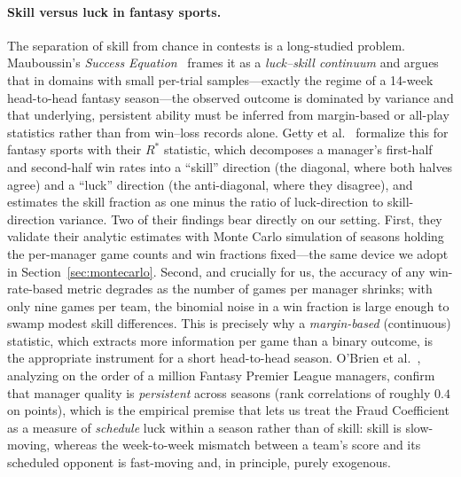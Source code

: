 \documentclass[11pt]{article}
\begin{document}
\paragraph{Skill versus luck in fantasy sports.}
The separation of skill from chance in contests is a long-studied problem.
Mauboussin's \emph{Success Equation}~\cite{mauboussin2012} frames it as a
\emph{luck--skill continuum} and argues that in domains with small per-trial
samples---exactly the regime of a 14-week head-to-head fantasy season---the
observed outcome is dominated by variance and that underlying, persistent
ability must be inferred from margin-based or all-play statistics rather than
from win--loss records alone. Getty et al.~\cite{getty2018} formalize this for
fantasy sports with their $R^*$ statistic, which decomposes a manager's
first-half and second-half win rates into a ``skill'' direction (the diagonal,
where both halves agree) and a ``luck'' direction (the anti-diagonal, where
they disagree), and estimates the skill fraction as one minus the ratio of
luck-direction to skill-direction variance. Two of their findings bear
directly on our setting. First, they validate their analytic estimates with
Monte Carlo simulation of seasons holding the per-manager game counts and win
fractions fixed---the same device we adopt in
Section~\ref{sec:montecarlo}. Second, and crucially for us, the accuracy of any
win-rate-based metric degrades as the number of games per manager shrinks;
with only nine games per team, the binomial noise in a win fraction is large
enough to swamp modest skill differences. This is precisely why a
\emph{margin-based} (continuous) statistic, which extracts more information
per game than a binary outcome, is the appropriate instrument for a short
head-to-head season. O'Brien et al.~\cite{obrien2021}, analyzing on the order
of a million Fantasy Premier League managers, confirm that manager quality is
\emph{persistent} across seasons (rank correlations of roughly $0.4$ on
points), which is the empirical premise that lets us treat the Fraud
Coefficient as a measure of \emph{schedule} luck within a season rather than
of skill: skill is slow-moving, whereas the week-to-week mismatch between a
team's score and its scheduled opponent is fast-moving and, in principle,
purely exogenous.
\end{document}
